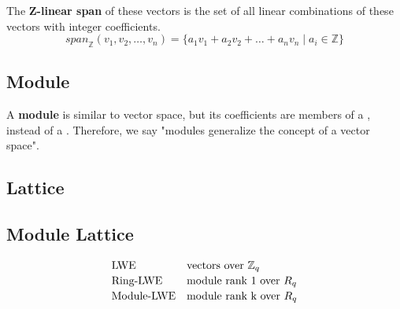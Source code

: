 \documentclass[12pt]{article}
\begin{document}
\noindent
The \textbf{Z-linear span} of these vectors is the set of all linear combinations
of these vectors with integer coefficients.
$$
    \textit{span}_{\mathbb{Z}}(v_1, v_2, \ldots, v_n) = \{a_1 v_1 + a_2 v_2 + \ldots + a_n v_n \mid a_i \in \mathbb{Z}\}
$$

\noindent
\subsection{Module}
A \textbf{module} is similar to vector space, but its coefficients are members of a , instead of a . Therefore, we say "modules generalize the concept of a vector space".

\subsection{Lattice}


\subsection{Module Lattice}

\[
\begin{array}{ll}
    \text{LWE} & \text{vectors over} \ \mathbb{Z}_q \TwoPtSp
    \text{Ring-LWE} & \text{module rank 1 over} \ R_q \TwoPtSp
    \text{Module-LWE} & \text{module rank} \ $k$ \ \text{over} \ R_q \TwoPtSp
\end{array}
\]
\end{document}
